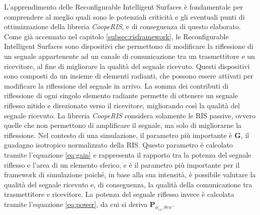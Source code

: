 L'apprendimento delle Reconfigurable Intelligent Surfaces è fondamentale per comprendere
al meglio quali sono le potenziali criticità e gli eventuali punti di ottimizzazione
della libreria \textit{CoopeRIS}, e di conseguenza di questo elaborato. Come già
accennato nel capitolo \ref{subsec:risframework}, le Reconfigurable Intelligent Surfaces
sono dispositivi che permettono di modificare la riflessione di un segnale appartenente
ad un canale di comunicazione tra un trasmettitore e un ricevitore, al fine di
migliorare la qualità del segnale ricevuto. Questi dispositivi sono composti da un
insieme di elementi radianti, che possono essere attivati per modificare la
riflessione del segnale in arrivo. La somma dei contributi di riflessione di ogni
singolo elemento radiante permette di ottenere un segnale riflesso nitido e direzionato
verso il ricevitore, migliorando così la qualità del segnale ricevuto. La libreria
\textit{CoopeRIS} considera solamente le RIS passive, ovvero quelle che non permettono
di amplificare il segnale, ma solo di migliorarne la riflessione. Nel contesto di
una simulazione, il parametro più importante è $\textbf{G}$, il guadagno isotropico
normalizzato della RIS. Questo parametro è calcolato tramite l'equazione
\ref{eq:gain} e rappresenta il rapporto tra la potenza del segnale riflesso e l'area
di un elemento sferico, e è il parametro più importante per il framework di simulazione
poiché, in base alla sua intensità, è possibile valutare la qualità del segnale ricevuto
e, di conseguenza, la qualità della comunicazione tra trasmettitore e ricevitore.
La potenza del segnale riflesso invece è calcolata tramite l'equazione
\ref{eq:power}, da cui si deriva $\textbf{P}_{\phi_{rx},\theta{rx}}$.


